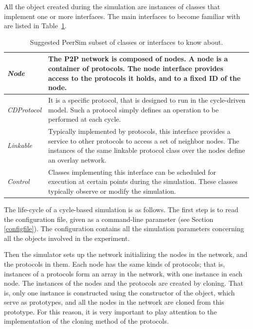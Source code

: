 \documentclass[a4paper,11pt]{article}
\begin{document}
All the object created during the simulation are instances of classes
that implement one or more interfaces. The
main interfaces to become familiar with are listed in
Table~\ref{t:psim_classes}.


\label{table1}
\begin{table}
\begin{center}\begin{tabular}{|l|p{11cm}|}
\hline 
\emph{Node}&
The P2P network is composed of nodes. A node is a container of
protocols. The node interface provides access to the protocols
it holds, and to a fixed ID of the node.\\
\hline 
\emph{CDProtocol}&
It is a specific protocol, that is designed to run in the cycle-driven
model. Such a protocol simply defines an operation to be performed at
each cycle.\\
\hline 
\emph{Linkable}&
Typically implemented by protocols, this interface provides a service
to other protocols to access a set of neighbor nodes.
The instances of the same linkable protocol class over the nodes define
an overlay network.\\
\hline 
\emph{Control}&
Classes implementing this interface can be scheduled for execution at
certain points during the simulation.
These classes typically observe or
modify the simulation.\\
\hline
\end{tabular}\end{center}

\caption{\label{t:psim_classes}Suggested PeerSim subset of classes or
  interfaces to know about.} 
\end{table}


The life-cycle of a cycle-based simulation is as follows. The first
step is to read the configuration file, given as a command-line 
parameter (see Section \ref{configfile}).
The configuration contains all the simulation parameters 
concerning all the
objects involved in the experiment.

Then the simulator sets up the network initializing the nodes in the
network, and the protocols in them.
Each node has the same kinds of protocols; that is, instances of
a protocols form an array in the network, with one instance in each
node.
The instances of the nodes and the protocols are created by cloning.
That is, only one instance is constructed using the constructor of the
object, which serve as prototypes, and all the nodes in the network are
cloned from this prototype.
For this reason, it is very important to play attention to the implementation
of the cloning method of the protocols.
\end{document}
